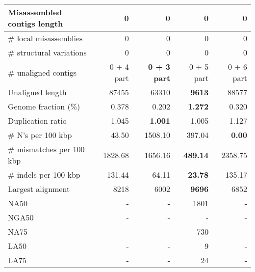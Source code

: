 \documentclass[12pt,a4paper]{article}
\begin{document}
\begin{table}[ht]
\begin{center}
\begin{tabular}{|l*{4}{|r}|}
Misassembled contigs length & 0 & 0 & 0 & 0 \\ \hline
\# local misassemblies & 0 & 0 & 0 & 0 \\ \hline
\# structural variations & 0 & 0 & 0 & 0 \\ \hline
\# unaligned contigs & 0 + 4 part & {\bf 0 + 3 part} & 0 + 5 part & 0 + 6 part \\ \hline
Unaligned length & 87455 & 63310 & {\bf 9613} & 88577 \\ \hline
Genome fraction (\%) & 0.378 & 0.202 & {\bf 1.272} & 0.320 \\ \hline
Duplication ratio & 1.045 & {\bf 1.001} & 1.005 & 1.127 \\ \hline
\# N's per 100 kbp & 43.50 & 1508.10 & 397.04 & {\bf 0.00} \\ \hline
\# mismatches per 100 kbp & 1828.68 & 1656.16 & {\bf 489.14} & 2358.75 \\ \hline
\# indels per 100 kbp & 131.44 & 64.11 & {\bf 23.78} & 135.17 \\ \hline
Largest alignment & 8218 & 6002 & {\bf 9696} & 6852 \\ \hline
NA50 & - & - & 1801 & - \\ \hline
NGA50 & - & - & - & - \\ \hline
NA75 & - & - & 730 & - \\ \hline
LA50 & - & - & 9 & - \\ \hline
LA75 & - & - & 24 & - \\ \hline
\end{tabular}
\end{center}
\end{table}
\end{document}
